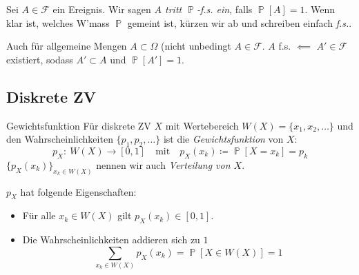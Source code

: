 \documentclass[a4paper,10pt]{article}
\def\R{\mathbb{R}}
\def\F{\mathcal{F}}
\renewcommand{\P}{\operatorname{\mathbb{P}}}
\numberwithin{equation}{section}
\begin{document}
\begin{mainbox}{}
    Sei \( A \in \F \) ein Ereignis. Wir sagen \emph{\( A \) tritt \( \P \)-f.s. ein}, falls \( \P[A] = 1 \).
    Wenn klar ist, welches W'mass \( \P \) gemeint ist, kürzen wir ab und schreiben einfach \emph{f.s.}.
\end{mainbox}

Auch für allgemeine Mengen \( A \subset \Omega \) (nicht unbedingt \( A \in \F \). \( A \) f.s. \( \impliedby \) \( A' \in \F \) existiert, sodass \( A' \subset A \) und \( \P[A'] = 1 \).

\subsection{Diskrete ZV}



\begin{mainbox}{Gewichtsfunktion}
    Für diskrete ZV \( X \) mit Wertebereich \( W(X) = \{ x_1, x_2, \dots \} \) und den Wahrscheinlichkeiten \( \{p_1, p_2, \dots \} \) ist die \emph{Gewichtsfunktion} von \( X \):
    \[
        p_X: \: W(X) \to [0, 1] \quad \text{mit} \quad p_X(x_k) \coloneqq \P[X = x_k] = p_k
    \]
    \( \{p_X(x_k)\}_{x_k \in W(X)} \) nennen wir auch \emph{Verteilung von \( X \)}.
\end{mainbox}

\begin{subbox}{}
    \( p_X \) hat folgende Eigenschaften:
    \begin{itemize}
        \item Für alle \( x_k \in W(X) \) gilt \( p_X(x_k) \in [0, 1] \).
        \item Die Wahrscheinlichkeiten addieren sich zu \( 1 \)
        \[
            \sum_{x_k \in W(X)} p_X(x_k) = \P[X \in W(X)] = 1
        \]
    \end{itemize}
\end{subbox}
\end{document}
